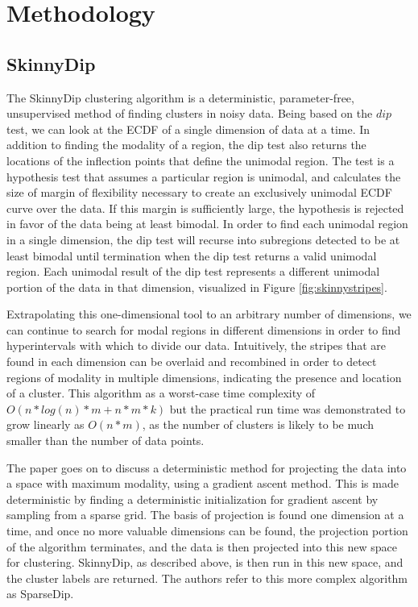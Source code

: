 \documentclass{sig-alternate-05-2015}
\begin{document}
\section{Methodology}
\subsection{SkinnyDip}

The SkinnyDip clustering algorithm is a deterministic, parameter-free, unsupervised method of finding clusters in noisy data. Being based on the $dip$ test, we can look at the ECDF of a single dimension of data at a time. In addition to finding the modality of a region, the dip test also returns the locations of the inflection points that define the unimodal region. The test is a hypothesis test that assumes a particular region is unimodal, and calculates the size of margin of flexibility necessary to create an exclusively unimodal ECDF curve over the data. If this margin is sufficiently large, the hypothesis is rejected in favor of the data being at least bimodal. In order to find each unimodal region in a single dimension, the dip test will recurse into subregions detected to be at least bimodal until termination when the dip test returns a valid unimodal region. Each unimodal result of the dip test represents a different unimodal portion of the data in that dimension, visualized in Figure \ref{fig:skinnystripes}.

Extrapolating this one-dimensional tool to an arbitrary number of dimensions, we can continue to search for modal regions in different dimensions in order to find hyperintervals with which to divide our data. Intuitively, the stripes that are found in each dimension can be overlaid and recombined in order to detect regions of modality in multiple dimensions, indicating the presence and location of a cluster. This algorithm as a worst-case time complexity of $O(n*log(n)*m + n*m*k)$ but the practical run time was demonstrated to grow linearly as $O(n*m)$, as the number of clusters is likely to be much smaller than the number of data points.

The paper goes on to discuss a deterministic method for projecting the data into a space with maximum modality, using a gradient ascent method. This is made deterministic by finding a deterministic initialization for gradient ascent by sampling from a sparse grid. The basis of projection is found one dimension at a time, and once no more valuable dimensions can be found, the projection portion of the algorithm terminates, and the data is then projected into this new space for clustering. SkinnyDip, as described above, is then run in this new space, and the cluster labels are returned. The authors refer to this more complex algorithm as SparseDip.
\end{document}
